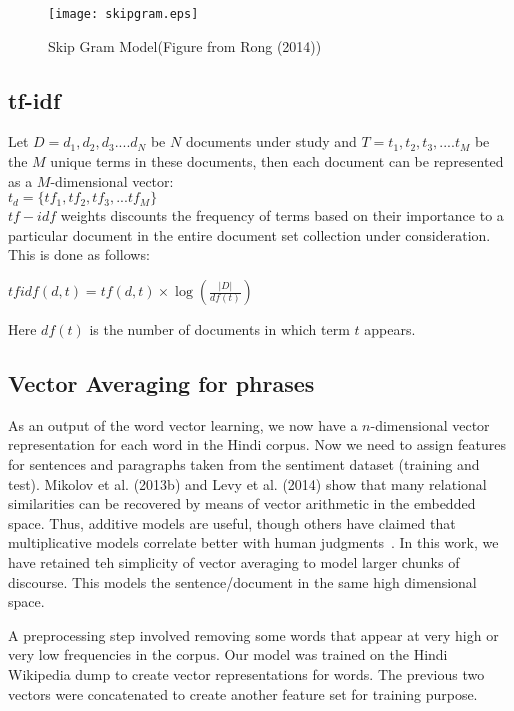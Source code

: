 \begin{figure}[ht!]
\centering
\texttt{[image: skipgram.eps]}
\caption{Skip Gram Model(Figure from Rong (2014)) \label{fig:skipgram}}
\end{figure}

\subsection{tf-idf}
Let $D=d_1, d_2, d_3....d_N$ be $N$ documents under study and $T=t_1, t_2, t_3,....t_M$ be the $M$ unique terms in these documents, then each document can be represented as a $M$-dimensional vector:\\
$t_d=\{tf_1,tf_2,tf_3,...tf_M\}$\\
$tf-idf$ weights discounts the frequency of terms based on their importance to a particular document in the entire document set collection under consideration. This is done as follows:
\begin{center}
$tfidf(d,t)=tf(d,t) \times \log(\frac{|D|}{df(t)})$ 
\end{center}
Here $df(t)$ is the number of documents in which term $t$ appears.

\subsection{Vector Averaging for phrases}
	\label{sec:vectoraveraging}
As an output of the word vector learning, we now have a $n$-dimensional
vector representation for each word in the Hindi corpus.  Now we need to
assign features for sentences and paragraphs taken from the sentiment dataset
(training and test).  Mikolov et al. (2013b) and Levy et al. (2014) show that
many relational similarities can be recovered by means of vector arithmetic
in the embedded space.  Thus, additive models are useful, though
others have claimed that multiplicative models correlate better with human
judgments~\cite{Mitchell:08,Socher:13}.  In this work, we have retained teh
simplicity of vector averaging to model larger chunks of  discourse.
This models the sentence/document in the same high dimensional space.

A preprocessing step involved removing some words that appear at very high or
very low frequencies in the corpus.  
Our model was trained on the Hindi Wikipedia dump to create vector
representations for words. The previous two vectors were concatenated to
create another feature set for training purpose.  

